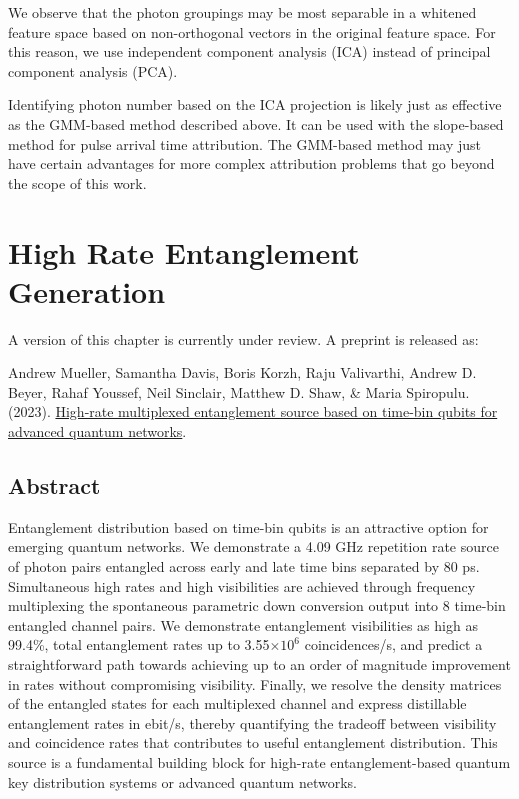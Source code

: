 \documentclass[11pt]{caltech_thesis} %
\begin{document}
We observe that the photon groupings may be most separable in a whitened feature space based on non-orthogonal vectors in the original feature space. For this reason, we use independent component analysis (ICA) instead of principal component analysis (PCA).

Identifying photon number based on the ICA projection is likely just as effective as the GMM-based method described above. It can be used with the slope-based method for pulse arrival time attribution. The GMM-based method may just have certain advantages for more complex attribution problems that go beyond the scope of this work.

\hypertarget{high-rate-entanglement-generation}{%
\chapter{High Rate Entanglement Generation}\label{high-rate-entanglement-generation}}

A version of this chapter is currently under review. A preprint is released as:

Andrew Mueller, Samantha Davis, Boris Korzh, Raju Valivarthi, Andrew D. Beyer, Rahaf Youssef, Neil Sinclair, Matthew D. Shaw, \& Maria Spiropulu. (2023). \href{https://arxiv.org/abs/2310.01804}{High-rate multiplexed entanglement source based on time-bin qubits for advanced quantum networks}.

\hypertarget{abstract-3}{%
\section{Abstract}\label{abstract-3}}

Entanglement distribution based on time-bin qubits is an attractive option for emerging quantum networks. We demonstrate a 4.09 GHz repetition rate source of photon pairs entangled across early and late time bins separated by 80 ps. Simultaneous high rates and high visibilities are achieved through frequency multiplexing the spontaneous parametric down conversion output into 8 time-bin entangled channel pairs. We demonstrate entanglement visibilities as high as 99.4\%, total entanglement rates up to 3.55$\times 10^6$ coincidences/s, and predict a straightforward path towards achieving up to an order of magnitude improvement in rates without compromising visibility. Finally, we resolve the density matrices of the entangled states for each multiplexed channel and express distillable entanglement rates in ebit/s, thereby quantifying the tradeoff between visibility and coincidence rates that contributes to useful entanglement distribution. This source is a fundamental building block for high-rate entanglement-based quantum key distribution systems or advanced quantum networks.
\end{document}
